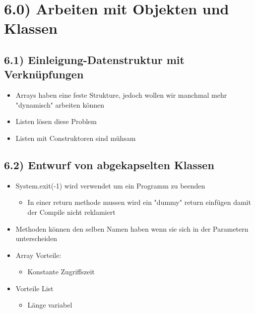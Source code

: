 \documentclass[11pt]{article}
\begin{document}
\section{6.0) Arbeiten mit Objekten und Klassen}
\label{sec:orgb1d4c91}
\subsection{6.1) Einleigung-Datenstruktur mit Verknüpfungen}
\label{sec:org7fb463e}
\begin{itemize}
\item Arrays haben eine feste Strukture, jedoch wollen wir manchmal mehr "dynamisch" arbeiten können\\
\item Listen lösen diese Problem\\
\item Listen mit Construktoren sind mühsam\\
\end{itemize}


\subsection{6.2) Entwurf von abgekapselten Klassen}
\label{sec:org03717fd}
\begin{itemize}
\item System.exit(-1) wird verwendet um ein Programm zu beenden\\
\begin{itemize}
\item In einer return methode mussen wird ein "dummy" return einfügen damit der Compile nicht reklamiert\\
\end{itemize}
\item Methoden können den selben Namen haben wenn sie sich in der Parametern unterscheiden\\

\item Array Vorteile:\\
\begin{itemize}
\item Konstante Zugriffszeit\\
\end{itemize}

\item Vorteile List\\
\begin{itemize}
\item Länge variabel\\
\end{itemize}
\end{itemize}
\end{document}
